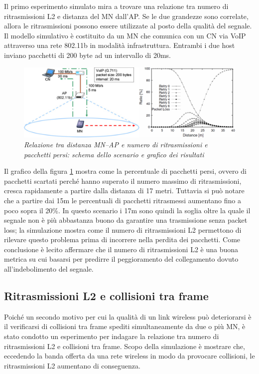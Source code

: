 \documentclass[12pt,a4paper,openright,twoside]{book}
\begin{document}
Il primo esperimento simulato mira a trovare una relazione tra numero
di ritrasmissioni L2 e distanza del MN dall'AP. Se le due grandezze
sono correlate, allora le ritrasmissioni possono essere utilizzate al
posto della qualità del segnale. Il modello simulativo è costituito da
un MN che comunica con un CN via VoIP attraverso una rete 802.11b in
modalità infrastruttura. Entrambi i due host inviano pacchetti di 200
byte ad un intervallo di 20ms.

\begin{figure}
\centering
\includegraphics[width=\textwidth]{img/mona-distance-signal-strength-simulation}
\caption{\em Relazione tra distanza MN--AP e numero di ritrasmissioni e
  pacchetti persi: schema dello scenario e grafico dei risultati}
\label{fig:mona-distance-signal-strength-simulation}
\end{figure}

Il grafico della figura
\ref{fig:mona-distance-signal-strength-simulation} mostra come la
percentuale di pacchetti persi, ovvero di pacchetti scartati perché
hanno superato il numero massimo di ritrasmissioni, cresca rapidamente
a partire dalla distanza di 17 metri. Tuttavia si può notare che a
partire dai 15m le percentuali di pacchetti ritrasmessi aumentano fino
a poco sopra il 20\%. In questo scenario i 17m sono quindi la soglia
oltre la quale il segnale non è più abbastanza buono da garantire una
trasmissione senza packet loss; la simulazione mostra come il numero
di ritrasmissioni L2 permettono di rilevare questo problema prima di
incorrere nella perdita dei pacchetti. Come conclusione è lecito
affermare che il numero di ritrasmissioni L2 è una buona metrica su
cui basarsi per predirre il peggioramento del collegamento dovuto
all'indebolimento del segnale.

\subsection{Ritrasmissioni L2 e collisioni tra frame}

Poiché un secondo motivo per cui la qualità di un link wireless può
deteriorarsi è il verificarsi di collisioni tra frame spediti
simultaneamente da due o più MN, è stato condotto un esperimento per
indagare la relazione tra numero di ritrasmissioni L2 e collisioni tra
frame. Scopo della simulazione è mostrare che, eccedendo la banda
offerta da una rete wireless in modo da provocare collisioni, le
ritrasmissioni L2 aumentano di conseguenza.
\end{document}
